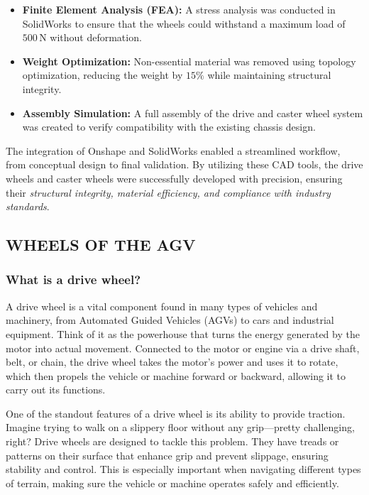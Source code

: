 \documentclass[../../main]{subfiles}
\begin{document}
\begin{itemize}

\item \textbf{Finite Element Analysis (FEA):} A stress analysis was conducted in SolidWorks to ensure that the wheels could withstand a maximum load of $500 \, \mathrm{N}$ without deformation.

\item \textbf{Weight Optimization:} Non-essential material was removed using topology optimization, reducing the weight by $15\%$ while maintaining structural integrity.

\item \textbf{Assembly Simulation:} A full assembly of the drive and caster wheel system was created to verify compatibility with the existing chassis design.

\end{itemize}

The integration of Onshape and SolidWorks enabled a streamlined workflow, from conceptual design to final validation. By utilizing these CAD tools, the drive wheels and caster wheels were successfully developed with precision, ensuring their \emph{structural integrity, material efficiency, and compliance with industry standards}.

\subsection{WHEELS OF THE AGV }
\subsubsection{What is a drive wheel?}
A drive wheel is a vital component found in many types of vehicles and machinery, from Automated Guided Vehicles (AGVs) to cars and industrial equipment. Think of it as the powerhouse that turns the energy generated by the motor into actual movement. Connected to the motor or engine via a drive shaft, belt, or chain, the drive wheel takes the motor's power and uses it to rotate, which then propels the vehicle or machine forward or backward, allowing it to carry out its functions.

One of the standout features of a drive wheel is its ability to provide traction. Imagine trying to walk on a slippery floor without any grip—pretty challenging, right? Drive wheels are designed to tackle this problem. They have treads or patterns on their surface that enhance grip and prevent slippage, ensuring stability and control. This is especially important when navigating different types of terrain, making sure the vehicle or machine operates safely and efficiently.
\end{document}
